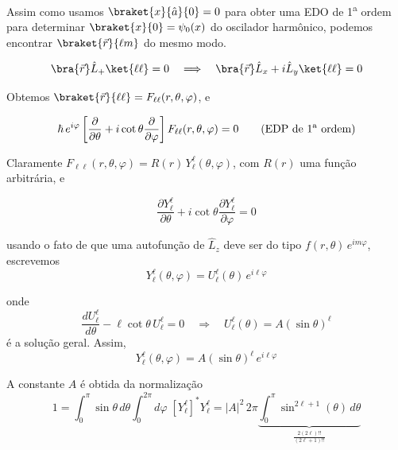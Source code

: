 Assim como usamos $\braket{x}{\hat{a}}{0} = 0$ para obter uma EDO de 1\textsuperscript{a} ordem para determinar $\braket{x}{0} = \psi_0(x)$ do oscilador harmônico, podemos encontrar $\braket{\vec{r}}{\ell m}$ do mesmo modo.

\begin{equation}
    \bra{\vec{r}} \hat{L}_+ \ket{\ell\ell} = 0 \quad \Longrightarrow \quad \bra{\vec{r}} \hat{L}_x + i\hat{L}_y \ket{\ell\ell} = 0
\label{eq:aula20_Lplus_ll_zero}
\end{equation}

Obtemos $\braket{\vec{r}}{\ell\ell} = F_{\ell\ell}(r,\theta,\varphi)$, e

\begin{equation}
    \hbar\, e^{i\varphi} \left[ \frac{\partial}{\partial \theta} + i\cot\theta \frac{\partial}{\partial \varphi} \right] F_{\ell\ell}(r,\theta,\varphi) = 0 \qquad \text{(EDP de 1\textsuperscript{a} ordem)}
\label{eq:aula20_EDP_1ordem}
\end{equation}

Claramente $F_{\ell\ell}(r,\theta,\varphi) = R(r)\, Y_\ell^\ell(\theta,\varphi)$, com $R(r)$ uma função arbitrária, e

\begin{equation}
    \frac{\partial Y_\ell^\ell}{\partial \theta} + i\cot\theta \frac{\partial Y_\ell^\ell}{\partial \varphi} = 0
\label{eq:aula20_EDP_Yll}
\end{equation}

usando o fato de que uma autofunção de $\hat{L}_z$ deve ser do tipo $f(r,\theta)\, e^{im\varphi}$, escrevemos
\begin{equation}
    Y_\ell^\ell(\theta,\varphi) = U_\ell^\ell(\theta)\, e^{i\ell\varphi}
\label{eq:aula20_Yll_separacao}
\end{equation}

onde
\begin{equation}
    \frac{dU_\ell^\ell}{d\theta} - \ell\cot\theta\, U_\ell^\ell = 0 \quad \Longrightarrow \quad U_\ell^\ell(\theta) = A(\sin\theta)^\ell
\label{eq:aula20_EDO_U}
\end{equation}
é a solução geral. Assim,
\begin{equation}
    Y_\ell^\ell(\theta,\varphi) = A(\sin\theta)^\ell\, e^{i\ell\varphi}
\label{eq:aula20_Yll_solucao}
\end{equation}

A constante $A$ é obtida da normalização
\begin{equation}
    1 = \int_0^\pi \sin\theta\,d\theta \int_0^{2\pi} d\varphi \; \left[Y_\ell^\ell\right]^* Y_\ell^\ell = |A|^2 \, 2\pi \underbrace{\int_0^\pi \sin^{2\ell+1}(\theta)\, d\theta}_{\displaystyle \frac{2(2\ell)!!}{(2\ell+1)!!}}
\label{eq:aula20_normalizacao_A}
\end{equation}

